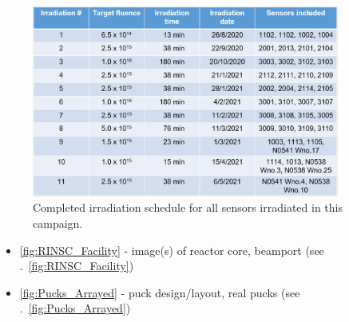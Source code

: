 \begin{figure}[!hbt]
  \begin{center}
    \includegraphics[width=0.90\textwidth]{figures/Completed_Irradiation_Schedule_at_RINSC}
    \caption{Completed irradiation schedule for all sensors irradiated in this campaign.}
    \label{fig:Irradiation_Schedule}
  \end{center}
\end{figure}


\begin{itemize}
    \item \ref{fig:RINSC_Facility} - image(s) of reactor core, beamport (see .~\ref{fig:RINSC_Facility})
    \item \ref{fig:Pucks_Arrayed} - puck design/layout, real pucks (see .~\ref{fig:Pucks_Arrayed})
\end{itemize}

